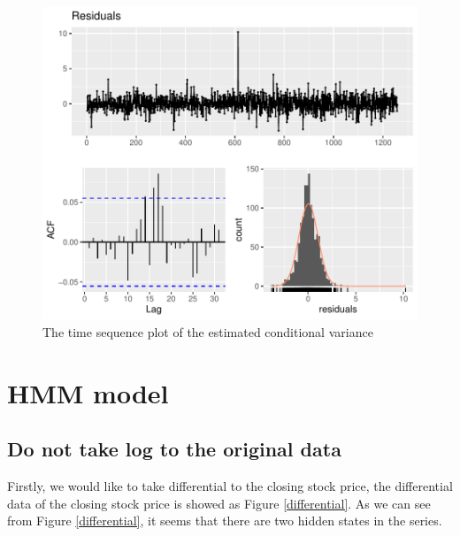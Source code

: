 \documentclass{article}
\begin{document}
\begin{figure}[H]
    \centering
    \includegraphics[width=0.7\linewidth]{images/BABA-res-garch-check-res}
    \caption{The time sequence plot of the estimated conditional variance}
    \label{BABA-res-garch-checkres}
\end{figure}

\section{HMM model}

\subsection{Do not take log to the original data}
Firstly, we would like to take differential to the closing stock price, the differential data of the closing stock price is showed as Figure \ref{differential}. 
As we can see from Figure \ref{differential}, it seems that there are two hidden states in the series.
\end{document}
